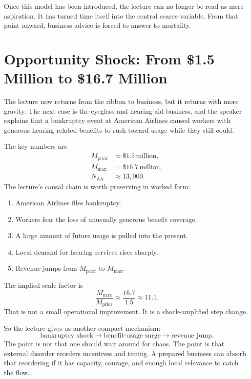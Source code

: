 Once this model has been introduced, the lecture can no longer be read as mere aspiration. It has turned time itself into the central scarce variable. From that point onward, business advice is forced to answer to mortality.

\section{Opportunity Shock: From \$1.5 Million to \$16.7 Million}

The lecture now returns from the ribbon to business, but it returns with more gravity. The next case is the eyeglass and hearing-aid business, and the speaker explains that a bankruptcy event at American Airlines caused workers with generous hearing-related benefits to rush toward usage while they still could.

The key numbers are
\begin{align}
M_{\text{prior}} &\approx \$1.5\,\text{million},\\
M_{\max} &= \$16.7\,\text{million},\\
N_{\text{AA}} &\approx 13{,}000.
\end{align}
The lecture's causal chain is worth preserving in worked form:
\begin{enumerate}
\item American Airlines files bankruptcy.
\item Workers fear the loss of unusually generous benefit coverage.
\item A large amount of future usage is pulled into the present.
\item Local demand for hearing services rises sharply.
\item Revenue jumps from \(M_{\text{prior}}\) to \(M_{\max}\).
\end{enumerate}
The implied scale factor is
\begin{equation}
\frac{M_{\max}}{M_{\text{prior}}}
\approx
\frac{16.7}{1.5}
\approx
11.1.
\end{equation}
That is not a small operational improvement. It is a shock-amplified step change.

So the lecture gives us another compact mechanism:
\begin{equation}
\text{bankruptcy shock} \rightarrow \text{benefit-usage surge} \rightarrow \text{revenue jump}.
\end{equation}
The point is not that one should wait around for chaos. The point is that external disorder reorders incentives and timing. A prepared business can absorb that reordering if it has capacity, courage, and enough local relevance to catch the flow.

